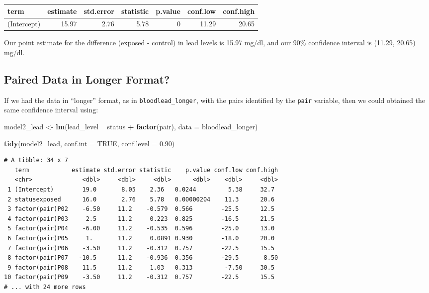 \documentclass[
]{book}
\newenvironment{Shaded}{\begin{snugshade}}{\end{snugshade}}
\newcommand{\DataTypeTok}[1]{\textcolor[rgb]{0.13,0.29,0.53}{#1}}
\newcommand{\FloatTok}[1]{\textcolor[rgb]{0.00,0.00,0.81}{#1}}
\newcommand{\KeywordTok}[1]{\textcolor[rgb]{0.13,0.29,0.53}{\textbf{#1}}}
\newcommand{\NormalTok}[1]{#1}
\newcommand{\OperatorTok}[1]{\textcolor[rgb]{0.81,0.36,0.00}{\textbf{#1}}}
\newcommand{\OtherTok}[1]{\textcolor[rgb]{0.56,0.35,0.01}{#1}}
\newcommand{\StringTok}[1]{\textcolor[rgb]{0.31,0.60,0.02}{#1}}
\begin{document}
\begin{tabular}{l|r|r|r|r|r|r}
\hline
term & estimate & std.error & statistic & p.value & conf.low & conf.high\\
\hline
(Intercept) & 15.97 & 2.76 & 5.78 & 0 & 11.29 & 20.65\\
\hline
\end{tabular}

Our point estimate for the difference (exposed - control) in lead levels is 15.97 mg/dl, and our 90\% confidence interval is (11.29, 20.65) mg/dl.

\hypertarget{paired-data-in-longer-format}{%
\subsection{Paired Data in Longer Format?}\label{paired-data-in-longer-format}}

If we had the data in ``longer'' format, as in \texttt{bloodlead\_longer}, with the pairs identified by the \texttt{pair} variable, then we could obtained the same confidence interval using:

\begin{Shaded}
\begin{Highlighting}[]
\NormalTok{model2_lead <-}\StringTok{ }\KeywordTok{lm}\NormalTok{(lead_level }\OperatorTok{~}\StringTok{ }\NormalTok{status }\OperatorTok{+}\StringTok{ }\KeywordTok{factor}\NormalTok{(pair), }\DataTypeTok{data =}\NormalTok{ bloodlead_longer)}

\KeywordTok{tidy}\NormalTok{(model2_lead, }\DataTypeTok{conf.int =} \OtherTok{TRUE}\NormalTok{, }\DataTypeTok{conf.level =} \FloatTok{0.90}\NormalTok{) }
\end{Highlighting}
\end{Shaded}

\begin{verbatim}
# A tibble: 34 x 7
   term            estimate std.error statistic    p.value conf.low conf.high
   <chr>              <dbl>     <dbl>     <dbl>      <dbl>    <dbl>     <dbl>
 1 (Intercept)        19.0       8.05    2.36   0.0244         5.38     32.7 
 2 statusexposed      16.0       2.76    5.78   0.00000204    11.3      20.6 
 3 factor(pair)P02    -6.50     11.2    -0.579  0.566        -25.5      12.5 
 4 factor(pair)P03     2.5      11.2     0.223  0.825        -16.5      21.5 
 5 factor(pair)P04    -6.00     11.2    -0.535  0.596        -25.0      13.0 
 6 factor(pair)P05     1.       11.2     0.0891 0.930        -18.0      20.0 
 7 factor(pair)P06    -3.50     11.2    -0.312  0.757        -22.5      15.5 
 8 factor(pair)P07   -10.5      11.2    -0.936  0.356        -29.5       8.50
 9 factor(pair)P08    11.5      11.2     1.03   0.313         -7.50     30.5 
10 factor(pair)P09    -3.50     11.2    -0.312  0.757        -22.5      15.5 
# ... with 24 more rows
\end{verbatim}
\end{document}
